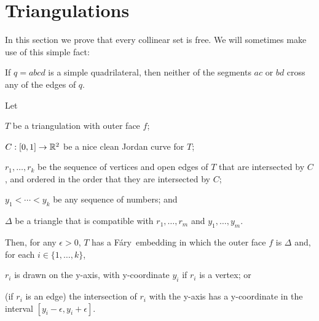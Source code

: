 \documentclass{patmorin}
\newcommand{\Fary}{Fáry}
\begin{document}
\section{Triangulations}

In this section we prove that every collinear set is free.
We will sometimes make use of this simple fact:
\begin{obs}
  If $q=abcd$ is a simple quadrilateral, then neither of the segments $ac$
  or $bd$ cross any of the edges of $q$.
\end{obs}

\begin{thm}
   Let
   \begin{compactenum}
     \item  $T$ be a triangulation with outer face $f$;
     \item  $C:[0,1]\to\mathbb{R}^2$ be a nice clean Jordan curve for $T$;
     \item $r_1,\ldots,r_k$ be the sequence of vertices and open edges
           of $T$ that are intersected by $C$, and ordered in the order
           that they are intersected by $C$;
     \item $y_1<\cdots<y_k$ be any sequence of numbers; and
     \item $\Delta$ be a triangle that is compatible with 
           $r_1,\ldots,r_m$ and $y_1,\ldots,y_m$.
  \end{compactenum}
   Then, for any $\epsilon>0$, $T$ has a
   \Fary\ embedding in which the outer face $f$ is $\Delta$
   and, for each $i\in\{1,\ldots,k\}$, 
   \begin{compactenum}
       \item $r_i$ is drawn on the y-axis, with y-coordinate $y_i$
         if $r_i$ is a vertex; or
       \item (if $r_i$ is an edge) the intersection of $r_i$ with the
         y-axis has a y-coordinate in the interval
         $[y_i-\epsilon,y_i+\epsilon]$.
   \end{compactenum}
\end{thm}
\end{document}
